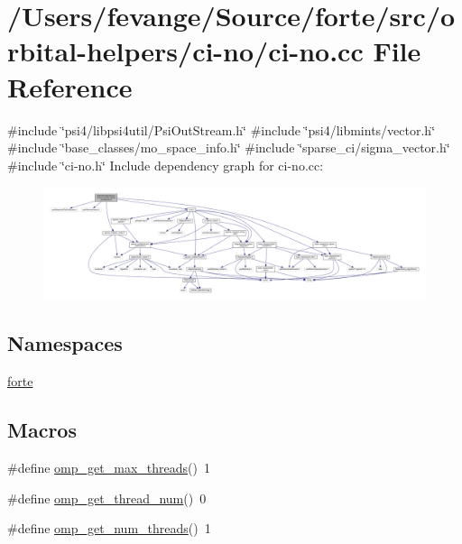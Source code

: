 \hypertarget{ci-no_8cc}{}\section{/\+Users/fevange/\+Source/forte/src/orbital-\/helpers/ci-\/no/ci-\/no.cc File Reference}
\label{ci-no_8cc}
{\ttfamily \#include \char`\"{}psi4/libpsi4util/\+Psi\+Out\+Stream.\+h\char`\"{}}\newline
{\ttfamily \#include \char`\"{}psi4/libmints/vector.\+h\char`\"{}}\newline
{\ttfamily \#include \char`\"{}base\+\_\+classes/mo\+\_\+space\+\_\+info.\+h\char`\"{}}\newline
{\ttfamily \#include \char`\"{}sparse\+\_\+ci/sigma\+\_\+vector.\+h\char`\"{}}\newline
{\ttfamily \#include \char`\"{}ci-\/no.\+h\char`\"{}}\newline
Include dependency graph for ci-\/no.cc\+:
\nopagebreak
\begin{figure}[H]
\begin{center}
\leavevmode
\includegraphics[width=350pt]{ci-no_8cc__incl}
\end{center}
\end{figure}
\subsection*{Namespaces}
\begin{DoxyCompactItemize}
\item 
 \mbox{\hyperlink{namespaceforte}{forte}}
\end{DoxyCompactItemize}
\subsection*{Macros}
\begin{DoxyCompactItemize}
\item 
\#define \mbox{\hyperlink{ci-no_8cc_a59e73060d1552ccda56039c7f3d25a84}{omp\+\_\+get\+\_\+max\+\_\+threads}}()~1
\item 
\#define \mbox{\hyperlink{ci-no_8cc_a889ec205c635b219999c761b28cc39ba}{omp\+\_\+get\+\_\+thread\+\_\+num}}()~0
\item 
\#define \mbox{\hyperlink{ci-no_8cc_a4353281743925f182316dba7cda58fee}{omp\+\_\+get\+\_\+num\+\_\+threads}}()~1
\end{DoxyCompactItemize}
